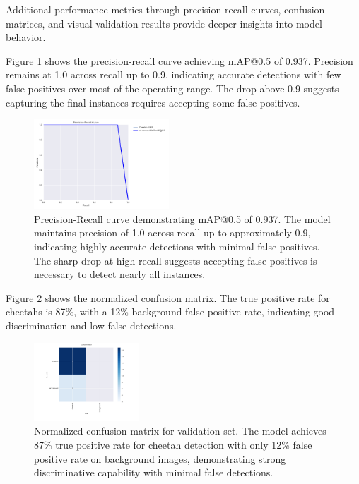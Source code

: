 \documentclass[conference]{IEEEtran}
\begin{document}
Additional performance metrics through precision-recall curves, confusion matrices, and visual validation results provide deeper insights into model behavior.

Figure \ref{fig:pr_curve} shows the precision-recall curve achieving mAP@0.5 of 0.937. Precision remains at 1.0 across recall up to 0.9, indicating accurate detections with few false positives over most of the operating range. The drop above 0.9 suggests capturing the final instances requires accepting some false positives.

\begin{figure}[htbp]
\centerline{\includegraphics[width=0.45\textwidth]{pr_curve.png}}
\caption{Precision-Recall curve demonstrating mAP@0.5 of 0.937. The model maintains precision of 1.0 across recall up to approximately 0.9, indicating highly accurate detections with minimal false positives. The sharp drop at high recall suggests accepting false positives is necessary to detect nearly all instances.}
\label{fig:pr_curve}
\end{figure}

Figure \ref{fig:confusion} shows the normalized confusion matrix. The true positive rate for cheetahs is 87\%, with a 12\% background false positive rate, indicating good discrimination and low false detections.

\begin{figure}[htbp]
\centerline{\includegraphics[width=0.35\textwidth]{confusion_matrix.png}}
\caption{Normalized confusion matrix for validation set. The model achieves 87\% true positive rate for cheetah detection with only 12\% false positive rate on background images, demonstrating strong discriminative capability with minimal false detections.}
\label{fig:confusion}
\end{figure}
\end{document}
